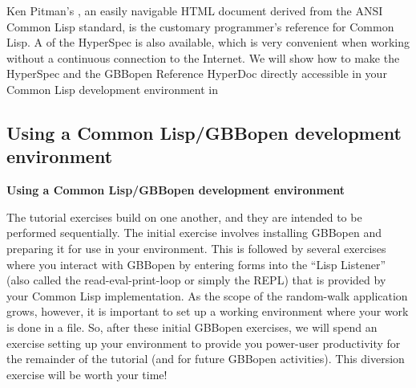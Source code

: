 Ken Pitman's , an
easily navigable HTML document derived from the ANSI Common Lisp standard, is
the customary programmer's reference for Common Lisp.  A
of the HyperSpec is also available, which is very convenient when working
without a continuous connection to the Internet.  We will show how to make the
HyperSpec and the GBBopen Reference HyperDoc directly accessible in your
Common Lisp development environment in

\T\subsection*{Using a Common Lisp/GBBopen development environment}
\W\textbf{\large Using a Common Lisp/GBBopen development environment}

The tutorial exercises build on one another, and they are intended to be
performed sequentially.  The initial exercise involves installing GBBopen and
preparing it for use in your environment.  This is followed by several
exercises where you interact with GBBopen by entering forms into the ``Lisp
Listener'' (also called the read-eval-print-loop or simply the REPL) that is
provided by your Common Lisp implementation.  As the scope of the random-walk
application grows, however, it is important to set up a working environment
where your work is done in a file.  So, after these initial GBBopen exercises,
we will spend an exercise setting up your environment to provide you
power-user productivity for the remainder of the tutorial (and for future
GBBopen activities).  This diversion exercise will be worth your time!

